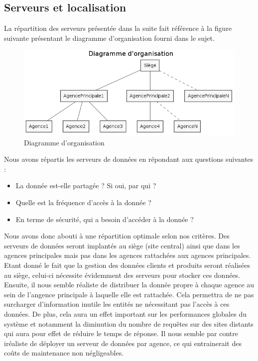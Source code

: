 \subsection{Serveurs et localisation}

La répartition des serveurs présentée dans la suite fait référence à la figure suivante présentant le diagramme d'organisation fourni dans le sujet.

\begin{figure}[H]
    \centering
	\includegraphics[scale=0.6]{figures/DO.png}
	\caption{Diagramme d'organisation}
\end{figure}

Nous avons répartis les serveurs de données en répondant aux questions suivantes :\\
\begin{itemize}
	\item[\textbullet] La donnée est-elle partagée ? Si oui, par qui ?
	\item[\textbullet] Quelle est la fréquence d'accès à la donnée ?
	\item[\textbullet] En terme de sécurité, qui a besoin d'accéder à la donnée ?\\
\end{itemize}

Nous avons donc abouti à une répartition optimale selon nos critères. Des serveurs de données seront implantés au siège (site central) ainsi que dans les agences principales mais pas dans les agences rattachées aux agences principales. Etant donné le fait que la gestion des données clients et produits seront réalisées au siège, celui-ci nécessite évidemment des serveurs pour stocker ces données. Ensuite, il nous semble réaliste de distribuer la donnée propre à chaque agence au sein de l'angence principale à laquelle elle est rattachée. Cela permettra de ne pas surcharger d'information inutile les entités ne nécessitant pas l'accès à ces données. De plus, cela aura un effet important sur les performances globales du système et notamment la diminution du nombre de requêtes sur des sites distants qui aura pour effet de réduire le temps de réponse. Il nous semble par contre iréaliste de déployer un serveur de données par agence, ce qui entrainerait des coûts de maintenance non négligeables.\\

